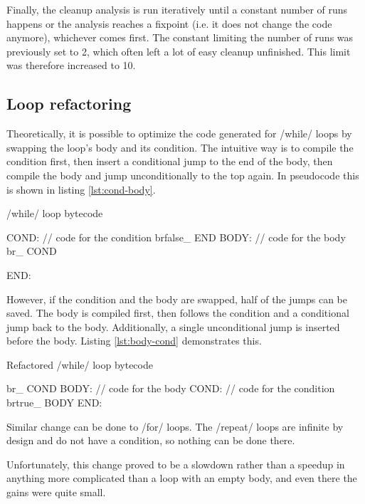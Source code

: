 Finally, the cleanup analysis is run iteratively until a constant number of runs happens or the analysis reaches a fixpoint (i.e. it does not change the code anymore), whichever comes first. The constant limiting the number of runs was previously set to 2, which often left a lot of easy cleanup unfinished. This limit was therefore increased to 10.


\subsection{Loop refactoring}

Theoretically, it is possible to optimize the code generated for \rinline/while/ loops by swapping the loop's body and its condition. The intuitive way is to compile the condition first, then insert a conditional jump to the end of the body, then compile the body and jump unconditionally to the top again. In pseudocode this is shown in listing \ref{lst:cond-body}.

\begin{listing}[htbp]
  \caption{\label{lst:cond-body}\rinline/while/ loop bytecode}
  \begin{ccode}
COND:
    // code for the condition
    brfalse_ END
BODY:
    // code for the body
    br_ COND


END:
  \end{ccode}
\end{listing}

However, if the condition and the body are swapped, half of the jumps can be saved. The body is compiled first, then follows the condition and a conditional jump back to the body. Additionally, a single unconditional jump is inserted before the body. Listing \ref{lst:body-cond} demonstrates this.

\begin{listing}[htbp]
  \caption{\label{lst:body-cond}Refactored \rinline/while/ loop bytecode}
  \begin{ccode}
    br_ COND
BODY:
    // code for the body
COND:
    // code for the condition
    brtrue_ BODY
END:
  \end{ccode}
\end{listing}

Similar change can be done to \rinline/for/ loops. The \rinline/repeat/ loops are infinite by design and do not have a condition, so nothing can be done there.

Unfortunately, this change proved to be a slowdown rather than a speedup in anything more complicated than a loop with an empty body, and even there the gains were quite small.

